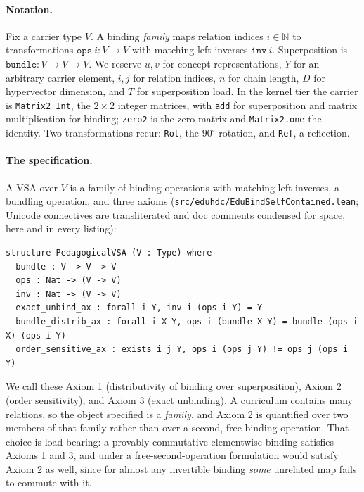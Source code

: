 \documentclass[10pt]{article}
\begin{document}
\paragraph{Notation.} Fix a carrier type $V$. A binding \emph{family} maps relation indices $i \in \mathbb{N}$ to transformations $\texttt{ops}\ i : V \to V$ with matching left inverses $\texttt{inv}\ i$. Superposition is $\texttt{bundle} : V \to V \to V$. We reserve $u,v$ for concept representations, $Y$ for an arbitrary carrier element, $i,j$ for relation indices, $n$ for chain length, $D$ for hypervector dimension, and $T$ for superposition load. In the kernel tier the carrier is \texttt{Matrix2 Int}, the $2\times2$ integer matrices, with \texttt{add} for superposition and matrix multiplication for binding; \texttt{zero2} is the zero matrix and \texttt{Matrix2.one} the identity. Two transformations recur: \texttt{Rot}, the $90^\circ$ rotation, and \texttt{Ref}, a reflection.

\paragraph{The specification.} A VSA over $V$ is a family of binding operations with matching left inverses, a bundling operation, and three axioms (\texttt{src/eduhdc/\allowbreak EduBindSelfContained.lean}; Unicode connectives are transliterated and doc comments condensed for space, here and in every listing):

\begin{lstlisting}
structure PedagogicalVSA (V : Type) where
  bundle : V -> V -> V
  ops : Nat -> (V -> V)
  inv : Nat -> (V -> V)
  exact_unbind_ax : forall i Y, inv i (ops i Y) = Y
  bundle_distrib_ax : forall i X Y, ops i (bundle X Y) = bundle (ops i X) (ops i Y)
  order_sensitive_ax : exists i j Y, ops i (ops j Y) != ops j (ops i Y)
\end{lstlisting}

We call these Axiom 1 (distributivity of binding over superposition), Axiom 2 (order sensitivity), and Axiom 3 (exact unbinding). A curriculum contains many relations, so the object specified is a \emph{family}, and Axiom 2 is quantified over two members of that family rather than over a second, free binding operation. That choice is load-bearing: a provably commutative elementwise binding satisfies Axioms 1 and 3, and under a free-second-operation formulation would satisfy Axiom 2 as well, since for almost any invertible binding \emph{some} unrelated map fails to commute with it.
\end{document}
